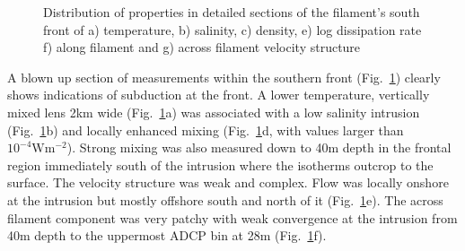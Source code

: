 \begin{figure}
\begin{widefig}{-.7cm}{-.7cm}
\centering {}%
%
\quad%
%
%
\caption{ Distribution of properties in detailed sections of the
filament's south front of a) temperature, b) salinity, c) density,
e) log dissipation rate f) along filament and g) across filament
velocity structure} \label{fig:cd114southfsec}
\end{widefig}\end{figure}

A blown up section of measurements within the southern front
(Fig.~\ref{fig:cd114southfsec}) clearly shows indications of
subduction at the front. A lower temperature, vertically mixed
lens 2km wide (Fig.~\ref{fig:cd114southfsec}a) was associated with
a low salinity intrusion (Fig.~\ref{fig:cd114southfsec}b) and
locally enhanced mixing (Fig.~\ref{fig:cd114southfsec}d, with
values larger than $10^{-4} \mathrm{W m^{-2}}$). Strong mixing was
also measured down to 40m depth in the frontal region immediately
south of the intrusion where the isotherms outcrop to the surface.
The velocity structure was weak and complex. Flow was locally
onshore at the intrusion but mostly offshore south and north of it
(Fig.~\ref{fig:cd114southfsec}e). The across filament component
was very patchy with weak convergence at the intrusion from 40m
depth to the uppermost ADCP bin at 28m
(Fig.~\ref{fig:cd114southfsec}f).

